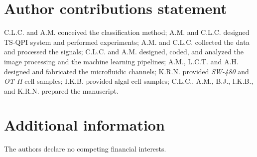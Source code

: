 \documentclass[aps,pra,reprint,longbibliography,superscriptaddress]{revtex4-1}
\begin{document}
\section*{Author contributions statement}

C.L.C. and A.M. conceived the classification method; A.M. and C.L.C. designed TS-QPI system and performed experiments; A.M. and C.L.C. collected the data and processed the signals; C.L.C. and A.M. designed, coded, and analyzed the image processing and the machine learning pipelines; A.M., L.C.T. and A.H. designed and fabricated the microfluidic channels; K.R.N. provided \textit{SW-480} and \textit{OT-II} cell samples; I.K.B. provided algal cell samples; C.L.C., A.M., B.J., I.K.B., and K.R.N. prepared the manuscript. 

\section*{Additional information}

The authors declare no competing financial interests.
\end{document}
